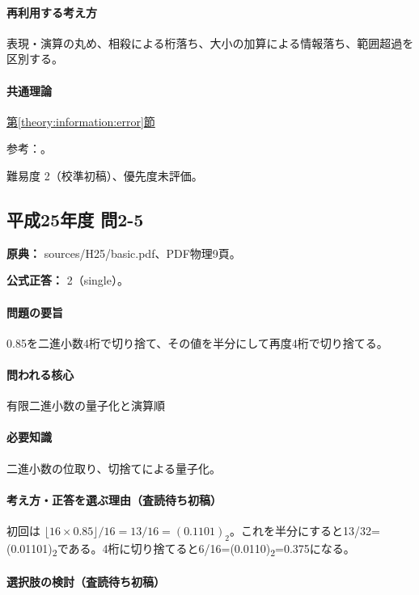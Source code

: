 \paragraph{再利用する考え方} 表現・演算の丸め、相殺による桁落ち、大小の加算による情報落ち、範囲超過を区別する。

\paragraph{共通理論} \hyperref[theory:information:error]{第\ref*{theory:information:error}節}

\par 参考：\cite{goldberg1991}。

\par 難易度 2（校準初稿）、優先度未評価。

\subsection{平成25年度 問2-5}
\label{q:h25-reg-basic-2-5}

\noindent\textbf{原典：} sources/H25/basic.pdf、PDF物理9頁。

\textbf{公式正答：} 2（single）。

\paragraph{問題の要旨} 0.85を二進小数4桁で切り捨て、その値を半分にして再度4桁で切り捨てる。

\paragraph{問われる核心} 有限二進小数の量子化と演算順

\paragraph{必要知識} 二進小数の位取り、切捨てによる量子化。

\paragraph{考え方・正答を選ぶ理由（査読待ち初稿）} 初回は \(\lfloor16\times0.85\rfloor/16=13/16=(0.1101)_2\)。これを半分にすると13/32=\allowbreak{}(0.01101)\textsubscript{2}である。4桁に切り捨てると6/16=\allowbreak{}(0.0110)\textsubscript{2}=0.375になる。

\paragraph{選択肢の検討（査読待ち初稿）}\mbox{}\par


